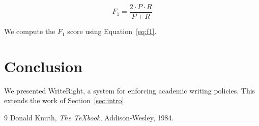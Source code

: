 \documentclass{article}
\begin{document}
\begin{equation}
  F_1 = \frac{2 \cdot P \cdot R}{P + R}
  \label{eq:f1}
\end{equation}

We compute the $F_1$ score using Equation~\ref{eq:f1}.

\section{Conclusion}
\label{sec:conclusion}
We presented WriteRight, a system for enforcing academic writing policies.
This extends the work of Section~\ref{sec:intro}.

\begin{thebibliography}{9}
  Donald Knuth, \textit{The \TeX book}, Addison-Wesley, 1984.
\end{thebibliography}
\end{document}
